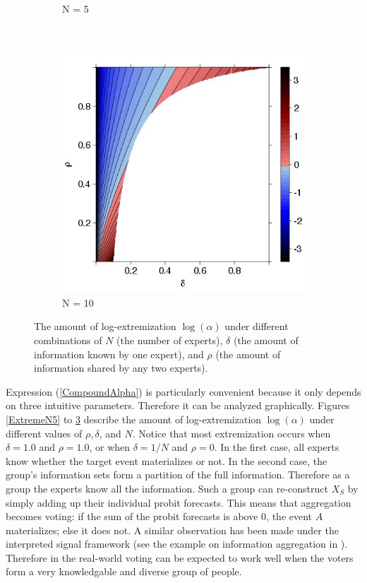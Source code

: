 \documentclass[11pt,twoside]{article}
\begin{document}
\begin{figure}
\begin{subfigure}[b]{0.32\textwidth}
\caption{N = 5}
\label{ExtremeN10}
        \end{subfigure}
        ~ %
        \begin{subfigure}[b]{0.32\textwidth}
                \includegraphics[width=\textwidth]{ExtremeN10.jpeg}
\caption{N = 10}
\label{ExtremeN30}
        \end{subfigure}
        \caption{ The amount of log-extremization $\log(\alpha)$ under different combinations of $N$ (the number of experts), $\delta$ (the amount of information known by one expert), and $\rho$ (the amount of information shared by any two experts).}
\end{figure}



Expression (\ref{CompoundAlpha}) is particularly convenient because it only depends on three intuitive parameters. Therefore it can be analyzed graphically. Figures \ref{ExtremeN5} to \ref{ExtremeN30} describe the amount of log-extremization $\log(\alpha)$ under different values of $\rho, \delta$, and $N$.  Notice that most extremization occurs when $\delta = 1.0$ and $\rho = 1.0$, or when  $\delta = 1/N$ and $\rho = 0$. In the first case, all experts know whether the target event materializes or not. In the second case, the group's information sets form a partition of the full information. Therefore as a group the experts know all the information. Such a group can re-construct $X_S$ by simply adding up their individual probit forecasts. This means that aggregation becomes voting: if the sum of the probit forecasts is above 0, the event $A$ materializes; else it does not. A similar observation has been made under the interpreted signal framework (see the example on information aggregation in \cite{hong2009interpreted}). Therefore in the real-world voting can be expected to work well when the voters form a very knowledgable and diverse group of people. 
\end{document}
